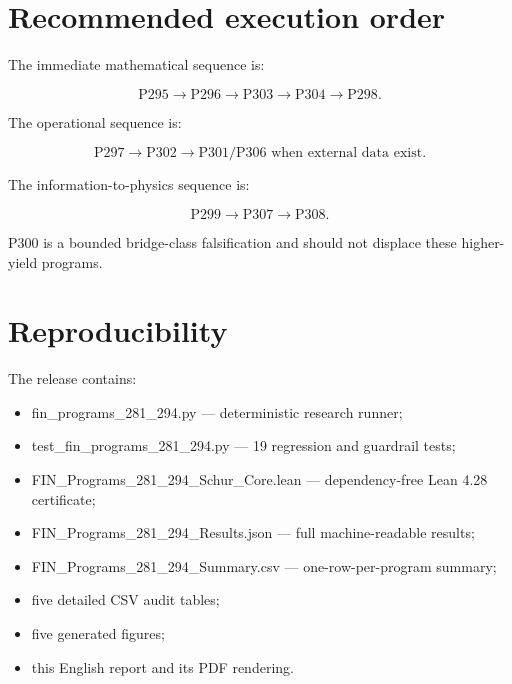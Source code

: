 \documentclass[11pt,a4paper,openany]{report}
\begin{document}
\chapter{Recommended execution order}

The immediate mathematical sequence is:

\[
\boxed{\text{P295}\rightarrow\text{P296}\rightarrow\text{P303}
\rightarrow\text{P304}\rightarrow\text{P298}}.
\]

The operational sequence is:

\[
\boxed{\text{P297}\rightarrow\text{P302}\rightarrow
\text{P301/P306 when external data exist}}.
\]

The information-to-physics sequence is:

\[
\boxed{\text{P299}\rightarrow\text{P307}\rightarrow\text{P308}}.
\]

P300 is a bounded bridge-class falsification and should not displace these higher-yield programs.

\chapter{Reproducibility}

The release contains:

\begin{itemize}
\item 
fin\_programs\_281\_294.py --- deterministic research runner;

\item 
test\_fin\_programs\_281\_294.py --- 19 regression and guardrail tests;

\item 
FIN\_Programs\_281\_294\_Schur\_Core.lean --- dependency-free Lean 4.28 certificate;

\item 
FIN\_Programs\_281\_294\_Results.json --- full machine-readable results;

\item 
FIN\_Programs\_281\_294\_Summary.csv --- one-row-per-program summary;

\item 
five detailed CSV audit tables;

\item 
five generated figures;

\item 
this English report and its PDF rendering.

\end{itemize}
\end{document}

